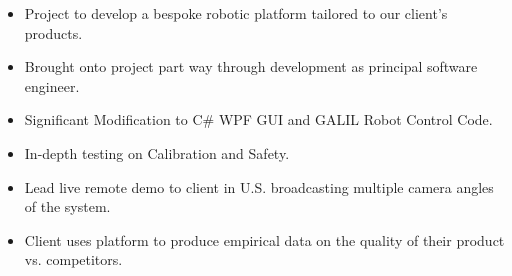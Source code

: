 {
  {\begin{itemize}
    \item Project to develop a bespoke robotic platform tailored to our client's products. 
    \item Brought onto project part way through development as principal software engineer.
    \item Significant Modification to C\# WPF GUI and GALIL Robot Control Code. 
    \item In-depth testing on Calibration and Safety. 
    \item Lead live remote demo to client in U.S. broadcasting multiple camera angles of the system. 
    \item Client uses platform to produce empirical data on the quality of their product vs. competitors.
  \end{itemize} 
  }
}